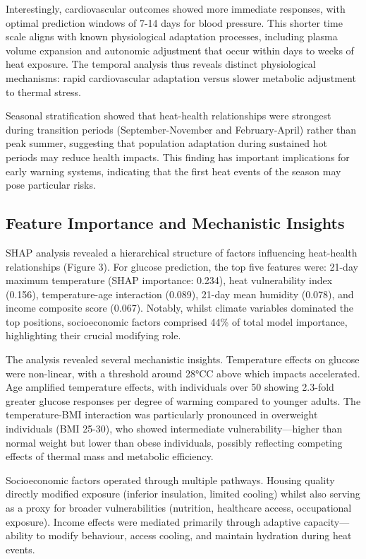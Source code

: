 \documentclass[11pt,a4paper]{article}
\newcommand{\degrees}{°C}
\begin{document}
Interestingly, cardiovascular outcomes showed more immediate responses, with optimal prediction windows of 7-14 days for blood pressure. This shorter time scale aligns with known physiological adaptation processes, including plasma volume expansion and autonomic adjustment that occur within days to weeks of heat exposure. The temporal analysis thus reveals distinct physiological mechanisms: rapid cardiovascular adaptation versus slower metabolic adjustment to thermal stress.

Seasonal stratification showed that heat-health relationships were strongest during transition periods (September-November and February-April) rather than peak summer, suggesting that population adaptation during sustained hot periods may reduce health impacts. This finding has important implications for early warning systems, indicating that the first heat events of the season may pose particular risks.

\subsection{Feature Importance and Mechanistic Insights}

SHAP analysis revealed a hierarchical structure of factors influencing heat-health relationships (Figure 3). For glucose prediction, the top five features were: 21-day maximum temperature (SHAP importance: 0.234), heat vulnerability index (0.156), temperature-age interaction (0.089), 21-day mean humidity (0.078), and income composite score (0.067). Notably, whilst climate variables dominated the top positions, socioeconomic factors comprised 44\% of total model importance, highlighting their crucial modifying role.

The analysis revealed several mechanistic insights. Temperature effects on glucose were non-linear, with a threshold around 28\degrees C above which impacts accelerated. Age amplified temperature effects, with individuals over 50 showing 2.3-fold greater glucose responses per degree of warming compared to younger adults. The temperature-BMI interaction was particularly pronounced in overweight individuals (BMI 25-30), who showed intermediate vulnerability—higher than normal weight but lower than obese individuals, possibly reflecting competing effects of thermal mass and metabolic efficiency.

Socioeconomic factors operated through multiple pathways. Housing quality directly modified exposure (inferior insulation, limited cooling) whilst also serving as a proxy for broader vulnerabilities (nutrition, healthcare access, occupational exposure). Income effects were mediated primarily through adaptive capacity—ability to modify behaviour, access cooling, and maintain hydration during heat events.
\end{document}
